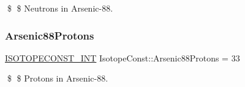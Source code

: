 \$ \$ Neutrons in Arsenic-\/88. \mbox{\label{group___isotope_const-_arsenic-_as88_ga279561ed92c9236eea5031d723e1a3ec}} 
\subsubsection{\texorpdfstring{Arsenic88\+Protons}{Arsenic88Protons}}
{\footnotesize\ttfamily \mbox{\hyperlink{group___isotope_const-_macros_ga5f18360b3e99483a35c32d789e62621c}{I\+S\+O\+T\+O\+P\+E\+C\+O\+N\+S\+T\+\_\+\+I\+NT}} Isotope\+Const\+::\+Arsenic88\+Protons = 33}

\$ \$ Protons in Arsenic-\/88. 